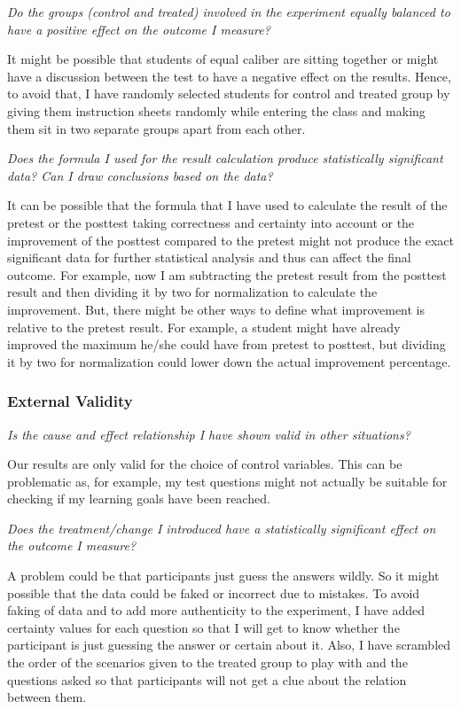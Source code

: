 \emph{Do the groups (control and treated) involved in the experiment equally balanced to have a positive effect on the outcome I measure?}

\medskip
\noindent It might be possible that students of equal caliber are sitting together or might have a discussion between the test to have a negative effect on the results. Hence, to avoid that, I have randomly selected students for control and treated group by giving them instruction sheets randomly while entering the class and making them sit in two separate groups apart from each other.

\emph{Does the formula I used for the result calculation produce statistically significant data? Can I draw conclusions based on the data?}

\medskip
\noindent It can be possible that the formula that I have used to calculate the result of the pretest or the posttest taking correctness and certainty into account or the improvement of the posttest compared to the pretest might not produce the exact significant data for further statistical analysis and thus can affect the final outcome. For example, now I am subtracting the pretest result from the posttest result and then dividing it by two for normalization to calculate the improvement. But, there might be other ways to define what improvement is relative to the pretest result. For example, a student might have already improved the maximum he/she could have from pretest to posttest, but dividing it by two for normalization could lower down the actual improvement percentage.

\subsubsection{External Validity}\label{subsubsec:externalvalidity}
\emph{Is the cause and effect relationship I have shown valid in other situations?}

\medskip
\noindent Our results are only valid for the choice of control variables.
This can be problematic as, for example, my test questions might not actually be suitable for checking if my learning goals have been reached.

\emph{Does the treatment/change I introduced have a statistically significant effect on the outcome I measure?}

\medskip
\noindent A problem could be that participants just guess the answers wildly. So it might possible that the data could be faked or incorrect due to mistakes. To avoid faking of data and to add more authenticity to the experiment, I have added certainty values for each question so that I will get to know whether the participant is just guessing the answer or certain about it. Also, I have scrambled the order of the scenarios given to the treated group to play with and the questions asked so that participants will not get a clue about the relation between them.

